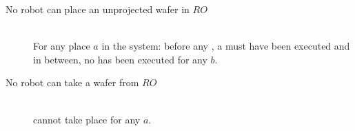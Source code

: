 \begin{description}
\item[No robot can place an unprojected wafer in $RO$] \hfill \\
For any place $a$ in the system: before any , a  must have been executed and in between, no  has been executed for any $b$.

\item[No robot can take a wafer from $RO$] \hfill \\
 cannot take place for any $a$.
 
\end{description}
